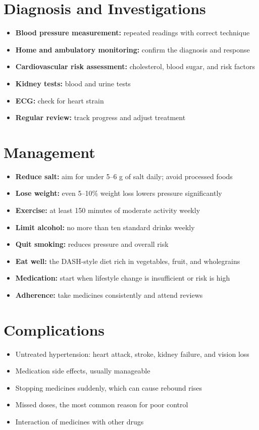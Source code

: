 \section*{Diagnosis and Investigations}
\begin{itemize}
    \item \textbf{Blood pressure measurement:} repeated readings with correct technique
    \item \textbf{Home and ambulatory monitoring:} confirm the diagnosis and response
    \item \textbf{Cardiovascular risk assessment:} cholesterol, blood sugar, and risk factors
    \item \textbf{Kidney tests:} blood and urine tests
    \item \textbf{ECG:} check for heart strain
    \item \textbf{Regular review:} track progress and adjust treatment
\end{itemize}

\section*{Management}
\begin{itemize}
    \item \textbf{Reduce salt:} aim for under 5--6 g of salt daily; avoid processed foods
    \item \textbf{Lose weight:} even 5--10\% weight loss lowers pressure significantly
    \item \textbf{Exercise:} at least 150 minutes of moderate activity weekly
    \item \textbf{Limit alcohol:} no more than ten standard drinks weekly
    \item \textbf{Quit smoking:} reduces pressure and overall risk
    \item \textbf{Eat well:} the DASH-style diet rich in vegetables, fruit, and wholegrains
    \item \textbf{Medication:} start when lifestyle change is insufficient or risk is high
    \item \textbf{Adherence:} take medicines consistently and attend reviews
\end{itemize}

\section*{Complications}
\begin{itemize}
    \item Untreated hypertension: heart attack, stroke, kidney failure, and vision loss
    \item Medication side effects, usually manageable
    \item Stopping medicines suddenly, which can cause rebound rises
    \item Missed doses, the most common reason for poor control
    \item Interaction of medicines with other drugs
\end{itemize}

